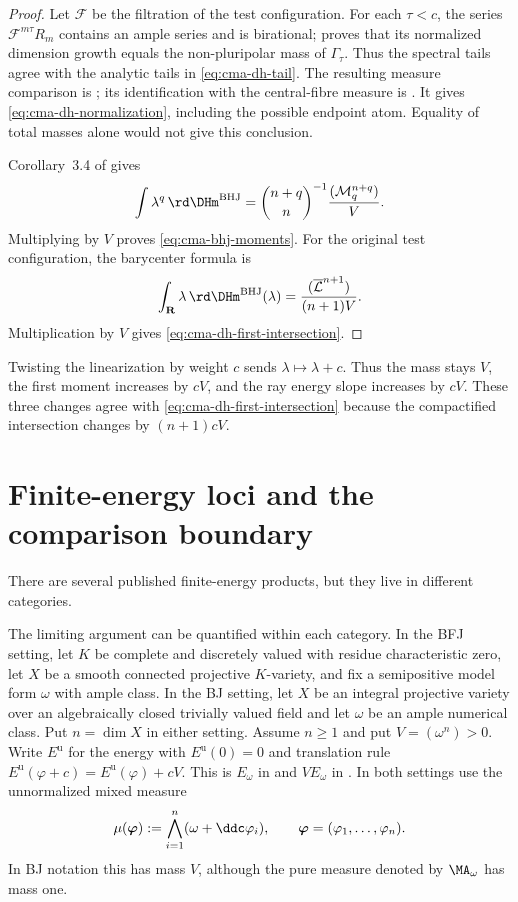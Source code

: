 \begin{proof}
Let $\mathcal F$ be the filtration of the test configuration. For each $\tau<c$, the series $\mathcal F^{m\tau}R_m$ contains an ample series and is birational;  proves that its normalized dimension growth equals the non-pluripolar mass of $\Gamma_\tau$. Thus the spectral tails agree with the analytic tails in \eqref{eq:cma-dh-tail}. The resulting measure comparison is ; its identification with the central-fibre measure is \cite[Proposition~5.9, p.~792]{BHJ17}. It gives \eqref{eq:cma-dh-normalization}, including the possible endpoint atom. Equality of total masses alone would not give this conclusion.

Corollary~3.4 of \cite[p.~774]{BHJ17} gives
\[
 \int\lambda^q\,\rd \DHm^{\mathrm{BHJ}}
 =\binom{n+q}{n}^{-1}
            \frac{(\mathcal M_q^{n+q})}{V}.
\]
Multiplying by $V$ proves
\eqref{eq:cma-bhj-moments}.
For the original test configuration, the barycenter formula
\cite[Proposition~3.12(iii), equation~(3.3), p.~777]{BHJ17} is
\[
 \int_{\mathbf R}\lambda\,
       \rd\DHm^{\mathrm{BHJ}}(\lambda)
 =\frac{(\overline{\mathcal L}^{n+1})}{(n+1)V}.
\]
Multiplication by $V$ gives
\eqref{eq:cma-dh-first-intersection}.
\end{proof}

\begin{remark}
\label{rem:cma-translation-test}
Twisting the linearization by weight $c$ sends
$\lambda\mapsto\lambda+c$.
Thus the mass stays $V$, the first moment increases by $cV$, and the
ray energy slope increases by $cV$.
These three changes agree with
\eqref{eq:cma-dh-first-intersection} because the compactified intersection
changes by $(n+1)cV$.
\end{remark}

\section{Finite-energy loci and the comparison boundary}
\label{sec:cma-finite-energy}

There are several published finite-energy products, but they live in
different categories.

The limiting argument can be quantified within each category. In the BFJ setting, let $K$ be complete and discretely valued with residue characteristic zero, let $X$ be a smooth connected projective $K$-variety, and fix a semipositive model form $\omega$ with ample class. In the BJ setting, let $X$ be an integral projective variety over an algebraically closed trivially valued field and let $\omega$ be an ample numerical class. Put $n=\dim X$ in either setting. Assume $n\geq1$ and put $V=(\omega^n)>0$. Write $E^{\mathrm u}$ for the energy with $E^{\mathrm u}(0)=0$ and translation rule $E^{\mathrm u}(\varphi+c)=E^{\mathrm u}(\varphi)+cV$. This is $E_\omega$ in  and $VE_\omega$ in . In both settings use the unnormalized mixed measure
\[
 \mu(\boldsymbol\varphi)
       :=\bigwedge_{i=1}^n(\omega+\ddc\varphi_i),
 \qquad \boldsymbol\varphi=(\varphi_1,\ldots,\varphi_n).
\]
In BJ notation this has mass $V$, although the pure measure denoted by $\MA_\omega$ has mass one.


